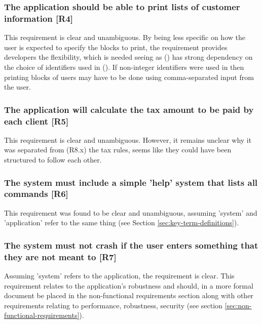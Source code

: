 \subsubsection{The application should be able to print lists of customer information [R4]}
This requirement is clear and unambiguous. 
By being less specific on how the user is expected to specify the blocks to print, the requirement provides developers the flexibility, which is needed seeing as (\RFour) has strong dependency on the choice of identifiers used in (\RTwo). If non-integer identifiers were used in \RTwo \space then printing blocks of users may have to be done using comma-separated input from the user. 

\subsubsection{The application will calculate the tax amount to be paid by each client [R5]} 
This requirement is clear and unambiguous. 
However, it remains unclear why it was separated from (R8.x) the tax rules, seems like they could have been structured to follow each other. 

\subsubsection{The system must include a simple 'help' system that lists all commands [R6]}

This requirement was found to be clear and unambiguous, assuming 'system' and 'application' refer to the same thing (see Section \ref{sec:key-term-definitions}). 

\subsubsection{The system must not crash if the user enters something that they are not meant to [R7]}
Assuming 'system' refers to the application, the requirement is clear. 
This requirement relates to the application's robustness and should, in a more formal document  be placed in the non-functional requirements section along with other requirements relating to performance, robustness, security (see section \ref{sec:non-functional-requirements}).

